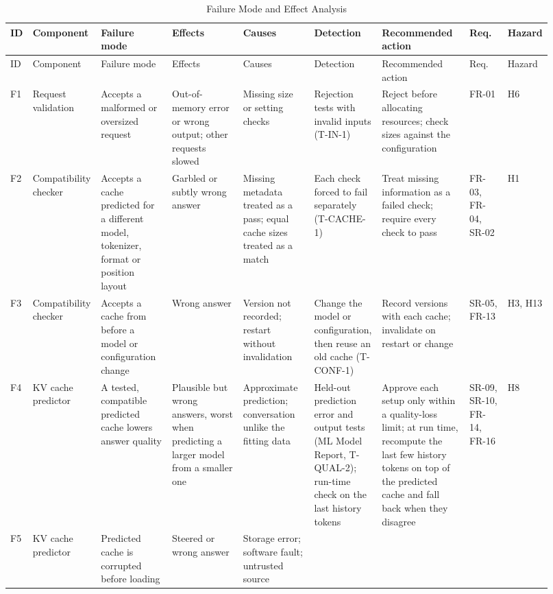 \documentclass{article}
\begin{document}
\begin{landscape}
\footnotesize
\setlength{\tabcolsep}{3pt}
\begin{longtable}{@{}p{0.04\linewidth}p{0.10\linewidth}p{0.13\linewidth}%
p{0.13\linewidth}p{0.13\linewidth}p{0.11\linewidth}p{0.16\linewidth}%
p{0.07\linewidth}p{0.05\linewidth}@{}}
\caption{Failure Mode and Effect Analysis}\label{tab:fmea}\\
\toprule
ID & Component & Failure mode & Effects & Causes & Detection &
Recommended action & Req. & Hazard\\
\midrule\endfirsthead
\toprule
ID & Component & Failure mode & Effects & Causes & Detection &
Recommended action & Req. & Hazard\\
\midrule\endhead
F1 & Request validation & Accepts a malformed or oversized request &
Out-of-memory error or wrong output; other requests slowed & Missing size
or setting checks & Rejection tests with invalid inputs (T-IN-1) & Reject
before allocating resources; check sizes against the configuration & FR-01
& H6\\
F2 & Compatibility checker & Accepts a cache predicted for a different
model, tokenizer, format or position layout & Garbled or subtly wrong
answer & Missing metadata treated as a pass; equal cache sizes treated as a
match & Each check forced to fail separately (T-CACHE-1) & Treat
missing information as a failed check; require every check to pass & FR-03,
FR-04, SR-02 & H1\\
F3 & Compatibility checker & Accepts a cache from before a model or
configuration change & Wrong answer & Version not recorded; restart without
invalidation & Change the model or configuration, then reuse an old cache
(T-CONF-1) & Record versions with each cache; invalidate on restart or
change & SR-05, FR-13 & H3, H13\\
F4 & KV cache predictor & A tested, compatible predicted cache lowers
answer quality & Plausible but wrong answers, worst when predicting a
larger model from a smaller one & Approximate prediction; conversation
unlike the fitting data & Held-out prediction error and output tests
(ML Model Report, T-QUAL-2); run-time check on the last history tokens & Approve
each setup only within a quality-loss limit; at run time, recompute the
last few history tokens on top of the predicted cache and fall back when
they disagree & SR-09, SR-10, FR-14, FR-16 & H8\\
F5 & KV cache predictor & Predicted cache is corrupted before loading &
Steered or wrong answer & Storage error; software fault; untrusted source

\end{longtable}
\end{landscape}
\end{document}
